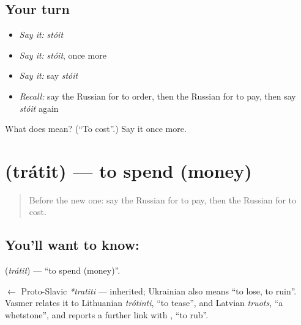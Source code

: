 \subsection*{Your turn}
\begin{itemize}
\raggedright
  \item \emph{Say it:} \emph{stóit}
  \item \emph{Say it:} \emph{stóit}, once more
  \item \emph{Say it:} say \emph{stóit}
  \item \emph{Recall:} say the Russian for to order, then the Russian for to pay, then say \emph{stóit} again
\end{itemize}

\begin{tcolorbox}[breakable,colback=teal!4,colframe=teal!35!black,title={Before you move on}]
What does  mean? (\textquotedblleft{}To cost\textquotedblright{}.) Say it once more.
\end{tcolorbox}
\section[\texorpdfstring{\ru{тратить} (trátit)}{тратить (trátit)}]{ (trátit) — to spend (money)}

\label{lesson:RU-C204-tratit}



\begin{quote}
Before the new one: say the Russian for to pay, then the Russian for to cost.
\end{quote}

\subsection*{You'll want to know: }
\textbf{} (\emph{trátit}) — \textquotedblleft{}to spend (money)\textquotedblright{}.

\begin{cousinweb}
\textbf{} $\leftarrow$ Proto-Slavic \emph{*tratiti} — inherited; Ukrainian \emph{} also means \textquotedblleft{}to lose, to ruin\textquotedblright{}. Vasmer relates it to Lithuanian \emph{trótinti}, \textquotedblleft{}to tease\textquotedblright{}, and Latvian \emph{truots}, \textquotedblleft{}a whetstone\textquotedblright{}, and reports a further link with \emph{}, \textquotedblleft{}to rub\textquotedblright{}.
\end{cousinweb}


